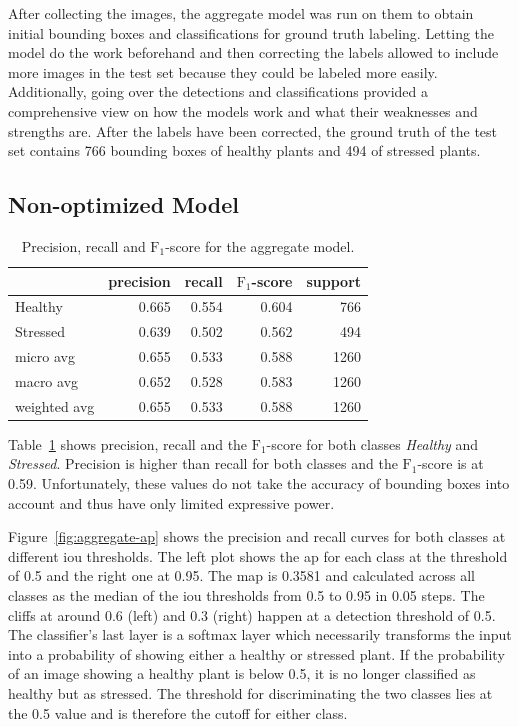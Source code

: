 \documentclass[draft,final]{vutinfth} %
\begin{document}
After collecting the images, the aggregate model was run on them to
obtain initial bounding boxes and classifications for ground truth
labeling. Letting the model do the work beforehand and then correcting
the labels allowed to include more images in the test set because they
could be labeled more easily. Additionally, going over the detections
and classifications provided a comprehensive view on how the models
work and what their weaknesses and strengths are. After the labels
have been corrected, the ground truth of the test set contains 766
bounding boxes of healthy plants and 494 of stressed plants.

\subsection{Non-optimized Model}
\label{ssec:model-non-optimized}

\begin{table}
  \centering
  \begin{tabular}{lrrrr}
    \toprule
    {} &  precision &  recall &  $\mathrm{F}_{1}$-score &  support \\
    \midrule
    Healthy      &      0.665 &   0.554 &     0.604 &    766 \\
    Stressed     &      0.639 &   0.502 &     0.562 &    494 \\
    micro avg    &      0.655 &   0.533 &     0.588 &   1260 \\
    macro avg    &      0.652 &   0.528 &     0.583 &   1260 \\
    weighted avg &      0.655 &   0.533 &     0.588 &   1260 \\
    \bottomrule
  \end{tabular}
  \caption{Precision, recall and $\mathrm{F}_1$-score for the
    aggregate model.}
  \label{tab:model-metrics}
\end{table}

Table~\ref{tab:model-metrics} shows precision, recall and the
$\mathrm{F}_1$-score for both classes \emph{Healthy} and
\emph{Stressed}. Precision is higher than recall for both classes and
the $\mathrm{F}_1$-score is at 0.59. Unfortunately, these values do
not take the accuracy of bounding boxes into account and thus have
only limited expressive power.

Figure~\ref{fig:aggregate-ap} shows the precision and recall curves
for both classes at different \gls{iou} thresholds. The left plot
shows the \gls{ap} for each class at the threshold of 0.5 and the
right one at 0.95. The \gls{map} is 0.3581 and calculated across all
classes as the median of the \gls{iou} thresholds from 0.5 to 0.95 in
0.05 steps. The cliffs at around 0.6 (left) and 0.3 (right) happen at
a detection threshold of 0.5. The classifier's last layer is a softmax
layer which necessarily transforms the input into a probability of
showing either a healthy or stressed plant. If the probability of an
image showing a healthy plant is below 0.5, it is no longer classified
as healthy but as stressed. The threshold for discriminating the two
classes lies at the 0.5 value and is therefore the cutoff for either
class.
\end{document}
